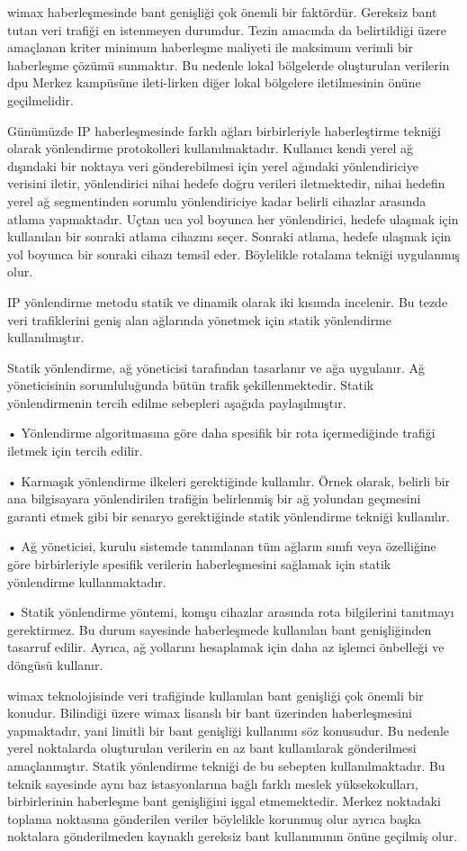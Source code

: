 \gls{wimax} haberleşmesinde bant genişliği çok önemli bir faktördür. Gereksiz bant tutan veri trafiği en istenmeyen durumdur. Tezin amacında da belirtildiği üzere amaçlanan kriter minimum haberleşme maliyeti ile maksimum verimli bir haberleşme çözümü sunmaktır. Bu nedenle lokal bölgelerde oluşturulan verilerin \gls{dpu} Merkez kampüsüne ileti-lirken diğer lokal bölgelere iletilmesinin önüne geçilmelidir. 

Günümüzde IP haberleşmesinde farklı ağları birbirleriyle haberleştirme tekniği olarak yönlendirme protokolleri kullanılmaktadır. 
Kullanıcı kendi yerel ağ dışındaki bir noktaya veri gönderebilmesi için yerel ağındaki yönlendiriciye verisini iletir, yönlendirici nihai hedefe doğru verileri iletmektedir, nihai hedefin yerel ağ segmentinden sorumlu yönlendiriciye kadar belirli cihazlar arasında atlama yapmaktadır. Uçtan uca yol boyunca her yönlendirici, hedefe ulaşmak için kullanılan bir sonraki atlama cihazını seçer. Sonraki atlama, hedefe ulaşmak için yol boyunca bir sonraki cihazı temsil eder. Böylelikle rotalama tekniği uygulanmış olur. 

IP yönlendirme metodu statik ve dinamik olarak iki kısımda incelenir. Bu tezde veri trafiklerini geniş alan ağlarında yönetmek için statik yönlendirme kullanılmıştır.

Statik yönlendirme, ağ yöneticisi tarafından tasarlanır ve ağa uygulanır. Ağ yöneticisinin sorumluluğunda bütün trafik şekillenmektedir. Statik yönlendirmenin tercih edilme sebepleri aşağıda paylaşılmıştır. \cite{parziale_2006}

•	Yönlendirme algoritmasına göre daha spesifik bir rota içermediğinde trafiği iletmek için tercih edilir.

•	Karmaşık yönlendirme ilkeleri gerektiğinde kullanılır. Örnek olarak, belirli bir ana bilgisayara yönlendirilen trafiğin belirlenmiş bir ağ yolundan geçmesini garanti etmek gibi bir senaryo gerektiğinde statik yönlendirme tekniği kullanılır.

•	Ağ yöneticisi, kurulu sistemde tanımlanan tüm ağların sınıfı veya özelliğine göre birbirleriyle spesifik verilerin haberleşmesini sağlamak için statik yönlendirme kullanmaktadır. 

•	Statik yönlendirme yöntemi, komşu cihazlar arasında rota bilgilerini tanıtmayı gerektirmez. Bu durum sayesinde haberleşmede kullanılan bant genişliğinden tasarruf edilir. Ayrıca, ağ yollarını hesaplamak için daha az işlemci önbelleği ve döngüsü kullanır.

\gls{wimax} teknolojisinde veri trafiğinde kullanılan bant genişliği çok önemli bir konudur. Bilindiği üzere \gls{wimax} lisanslı bir bant üzerinden haberleşmesini yapmaktadır, yani limitli bir bant genişliği kullanımı söz konusudur. Bu nedenle yerel noktalarda oluşturulan verilerin en az bant kullanılarak gönderilmesi amaçlanmıştır. Statik yönlendirme tekniği de bu sebepten kullanılmaktadır. Bu teknik sayesinde aynı baz istasyonlarına bağlı farklı meslek yüksekokulları, birbirlerinin haberleşme bant genişliğini işgal etmemektedir. Merkez noktadaki toplama noktasına gönderilen veriler böylelikle korunmuş olur ayrıca başka noktalara gönderilmeden kaynaklı gereksiz bant kullanımının önüne geçilmiş olur.

